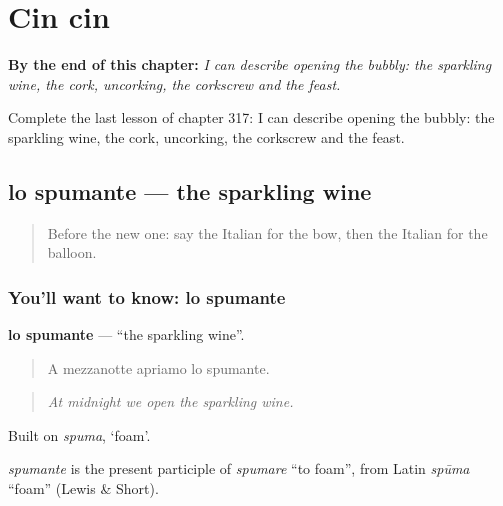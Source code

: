 
\chapter{Cin cin}
\label{ch:it-cin-cin}

\begin{chapteropening}
\textbf{By the end of this chapter:} \emph{I can describe opening the bubbly: the sparkling wine, the cork, uncorking, the corkscrew and the feast.}

Complete the last lesson of chapter 317: I can describe opening the bubbly: the sparkling wine, the cork, uncorking, the corkscrew and the feast.
\end{chapteropening}

\section[lo spumante]{lo spumante — the sparkling wine}

\label{lesson:IT-C317-spumante}



\begin{quote}
Before the new one: say the Italian for the bow, then the Italian for the balloon.
\end{quote}

\subsection*{You'll want to know: lo spumante}
\textbf{lo spumante} — \textquotedblleft{}the sparkling wine\textquotedblright{}.

\begin{quote}
A mezzanotte apriamo lo spumante.
\end{quote}

\begin{quote}
\emph{At midnight we open the sparkling wine.}
\end{quote}

Built on \emph{spuma}, ‘foam’.

\begin{cousinweb}
\emph{spumante} is the present participle of \emph{spumare} \textquotedblleft{}to foam\textquotedblright{}, from Latin \emph{spūma} \textquotedblleft{}foam\textquotedblright{} (Lewis \& Short).
\end{cousinweb}

